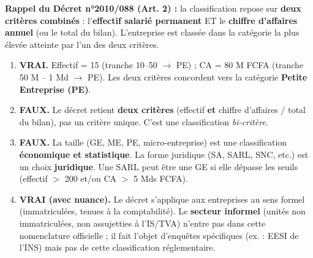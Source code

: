 \documentclass[11pt]{article}
\begin{document}
\begin{corrige}
\textbf{Rappel du Décret n°2010/088 (Art. 2) :} la classification repose sur \textbf{deux critères combinés} : l'\textbf{effectif salarié permanent} ET le \textbf{chiffre d'affaires annuel} (ou le total du bilan). L'entreprise est classée dans la catégorie la plus élevée atteinte par l'un des deux critères.

\begin{enumerate}
    \item \textbf{VRAI.} Effectif = 15 (tranche 10--50 $\rightarrow$ PE) ; CA = 80 M FCFA (tranche 50 M -- 1 Md $\rightarrow$ PE). Les deux critères concordent vers la catégorie \textbf{Petite Entreprise (PE)}.
    \item \textbf{FAUX.} Le décret retient \textbf{deux critères} (effectif \textbf{et} chiffre d'affaires / total du bilan), pas un critère unique. C'est une classification \emph{bi-critère}.
    \item \textbf{FAUX.} La taille (GE, ME, PE, micro-entreprise) est une classification \textbf{économique et statistique}. La forme juridique (SA, SARL, SNC, etc.) est un choix \textbf{juridique}. Une SARL peut être une GE si elle dépasse les seuils (effectif $>$ 200 et/ou CA $>$ 5 Mds FCFA).
    \item \textbf{VRAI (avec nuance).} Le décret s'applique aux entreprises au sens formel (immatriculées, tenues à la comptabilité). Le \textbf{secteur informel} (unités non immatriculées, non assujetties à l'IS/TVA) n'entre pas dans cette nomenclature officielle ; il fait l'objet d'enquêtes spécifiques (ex. : EESI de l'INS) mais pas de cette classification réglementaire.
\end{enumerate}
\end{corrige}
\end{document}
